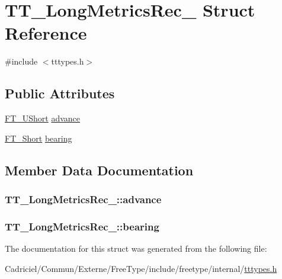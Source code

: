 \hypertarget{struct_t_t___long_metrics_rec__}{\section{T\-T\-\_\-\-Long\-Metrics\-Rec\-\_\- Struct Reference}
\label{struct_t_t___long_metrics_rec__}
}


{\ttfamily \#include $<$tttypes.\-h$>$}

\subsection*{Public Attributes}
\begin{DoxyCompactItemize}
\item 
\hyperlink{fttypes_8h_a937f6c17cf5ffd09086d8610c37b9f58}{F\-T\-\_\-\-U\-Short} \hyperlink{struct_t_t___long_metrics_rec___a47100e42b52486bc374f80ed2795361d}{advance}
\item 
\hyperlink{fttypes_8h_aa7279be89046a2563cd3d4d6651fbdcf}{F\-T\-\_\-\-Short} \hyperlink{struct_t_t___long_metrics_rec___a0d74e3eb8611b0a5e89e338af35be4da}{bearing}
\end{DoxyCompactItemize}


\subsection{Member Data Documentation}
\hypertarget{struct_t_t___long_metrics_rec___a47100e42b52486bc374f80ed2795361d}{
\subsubsection[{advance}]{ T\-T\-\_\-\-Long\-Metrics\-Rec\-\_\-\-::advance}}\label{struct_t_t___long_metrics_rec___a47100e42b52486bc374f80ed2795361d}
\hypertarget{struct_t_t___long_metrics_rec___a0d74e3eb8611b0a5e89e338af35be4da}{
\subsubsection[{bearing}]{ T\-T\-\_\-\-Long\-Metrics\-Rec\-\_\-\-::bearing}}\label{struct_t_t___long_metrics_rec___a0d74e3eb8611b0a5e89e338af35be4da}


The documentation for this struct was generated from the following file\-:\begin{DoxyCompactItemize}
\item 
Cadriciel/\-Commun/\-Externe/\-Free\-Type/include/freetype/internal/\hyperlink{tttypes_8h}{tttypes.\-h}\end{DoxyCompactItemize}
